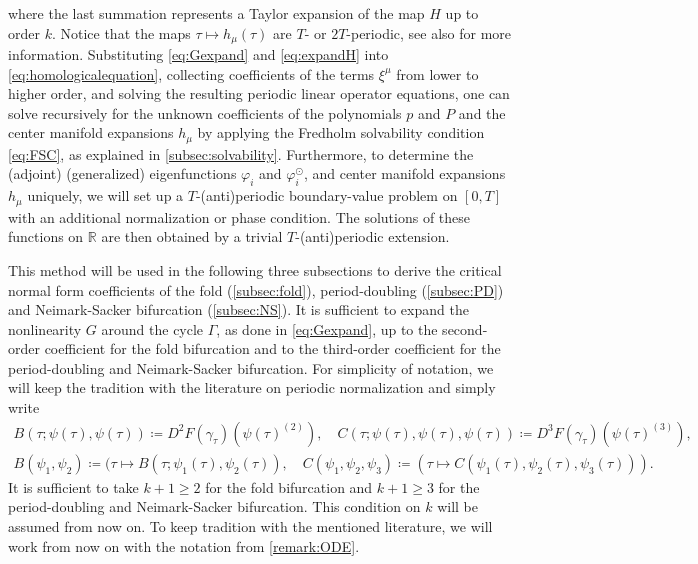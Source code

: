 \documentclass[english]{myarticle}
\begin{document}
\begin{sloppypar}
where the last summation represents a Taylor expansion of the map $H$ up to order $k$. Notice that the maps $\tau \mapsto h_\mu(\tau)$ are $T$- or $2T$-periodic, see also \cite[Theorem 10, 11 and 12]{Article1} for more information. Substituting \eqref{eq:Gexpand} and \eqref{eq:expandH} into \eqref{eq:homologicalequation}, collecting coefficients of the terms $\xi^\mu$ from lower to higher order, and solving the resulting periodic linear operator equations, one can solve recursively for the unknown coefficients of the polynomials $p$ and $P$ and the center manifold expansions $h_\mu$ by applying the Fredholm solvability condition \eqref{eq:FSC}, as explained in \cref{subsec:solvability}. Furthermore, to determine the (adjoint) (generalized) eigenfunctions $\varphi_i$ and $\varphi_i^\odot$, and center manifold expansions $h_\mu$ uniquely, we will set up a $T$-(anti)periodic boundary-value problem on $[0,T]$ with an additional normalization or phase condition. The solutions of these functions on $\mathbb{R}$ are then obtained by a trivial $T$-(anti)periodic extension.

This method will be used in the following three subsections to derive the critical normal form coefficients of the fold (\cref{subsec:fold}), period-doubling (\cref{subsec:PD}) and Neimark-Sacker bifurcation (\cref{subsec:NS}). It is sufficient to expand the nonlinearity $G$ around the cycle $\Gamma$, as done in \eqref{eq:Gexpand}, up to the second-order coefficient for the fold bifurcation and to the third-order coefficient for the period-doubling and Neimark-Sacker bifurcation. For simplicity of notation, we will keep the tradition with the literature \cite{Kuznetsov2005,Witte2013,Witte2014} on periodic normalization and simply write
\begin{gather*}
    B(\tau;\psi(\tau),\psi(\tau)) \coloneqq D^2F(\gamma_\tau)(\psi(\tau)^{(2)}),  \quad C(\tau;\psi(\tau),\psi(\tau),\psi(\tau)) \coloneqq D^3F(\gamma_\tau)(\psi(\tau)^{(3)}), \\
    B(\psi_1,\psi_2) \coloneqq (\tau \mapsto B(\tau;\psi_1(\tau),\psi_2(\tau)), \quad C(\psi_1,\psi_2,\psi_3) \coloneqq (\tau \mapsto C(\psi_1(\tau),\psi_2(\tau),\psi_3(\tau))).
\end{gather*}
It is sufficient to take $k + 1 \geq 2$ for the fold bifurcation and $k + 1 \geq 3$ for the period-doubling and Neimark-Sacker bifurcation. This condition on $k$ will be assumed from now on. To keep tradition with the mentioned literature, we will work from now on with the notation from \cref{remark:ODE}.


\end{sloppypar}
\end{document}
